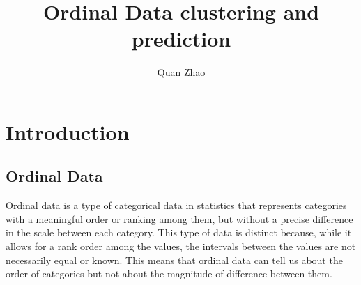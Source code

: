 \documentclass{article}
\begin{document}
\title{Ordinal Data clustering and prediction}

\author{Quan Zhao}

\maketitle



\section{Introduction}




\subsection*{Ordinal Data}

Ordinal data is a type of categorical data in statistics that represents categories with a meaningful order or ranking among them, but without a precise difference in the scale between each category. This type of data is distinct because, while it allows for a rank order among the values, the intervals between the values are not necessarily equal or known. This means that ordinal data can tell us about the order of categories but not about the magnitude of difference between them.
\end{document}
